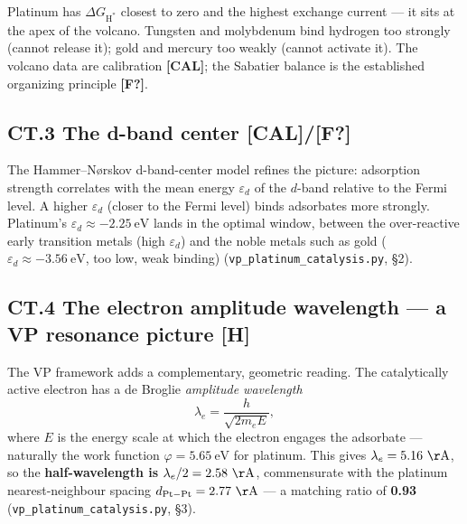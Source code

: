 \documentclass[
  10pt,
]{article}
\begin{document}
Platinum has \(\Delta G_{\mathrm H^*}\) closest to zero and the highest
exchange current --- it sits at the apex of the volcano. Tungsten and
molybdenum bind hydrogen too strongly (cannot release it); gold and
mercury too weakly (cannot activate it). The volcano data are
calibration \textbf{{[}CAL{]}}; the Sabatier balance is the established
organizing principle \textbf{{[}F?{]}}.

\hypertarget{ct.3-the-d-band-center-calf}{%
\subsection{\texorpdfstring{CT.3 The d-band center
\textbf{{[}CAL{]}/{[}F?{]}}}{CT.3 The d-band center {[}CAL{]}/{[}F?{]}}}\label{ct.3-the-d-band-center-calf}}

The Hammer--Nørskov d-band-center model refines the picture: adsorption
strength correlates with the mean energy \(\varepsilon_d\) of the
\(d\)-band relative to the Fermi level. A higher \(\varepsilon_d\)
(closer to the Fermi level) binds adsorbates more strongly. Platinum's
\(\varepsilon_d \approx -2.25\ \mathrm{eV}\) lands in the optimal
window, between the over-reactive early transition metals (high
\(\varepsilon_d\)) and the noble metals such as gold
(\(\varepsilon_d \approx -3.56\ \mathrm{eV}\), too low, weak binding)
(\texttt{vp\_platinum\_catalysis.py}, §2).

\hypertarget{ct.4-the-electron-amplitude-wavelength-a-vp-resonance-picture-h}{%
\subsection{\texorpdfstring{CT.4 The electron amplitude wavelength --- a
VP resonance picture
\textbf{{[}H{]}}}{CT.4 The electron amplitude wavelength --- a VP resonance picture {[}H{]}}}\label{ct.4-the-electron-amplitude-wavelength-a-vp-resonance-picture-h}}

The VP framework adds a complementary, geometric reading. The
catalytically active electron has a de Broglie \emph{amplitude
wavelength} \[ \lambda_e = \frac{h}{\sqrt{2 m_e E}}, \] where \(E\) is
the energy scale at which the electron engages the adsorbate ---
naturally the work function \(\varphi = 5.65\ \mathrm{eV}\) for
platinum. This gives \(\lambda_e = 5.16\ \mathrm{\AA}\), so the
\textbf{half-wavelength is \(\lambda_e/2 = 2.58\ \mathrm{\AA}\)},
commensurate with the platinum nearest-neighbour spacing
\(d_{\mathrm{Pt-Pt}} = 2.77\ \mathrm{\AA}\) --- a matching ratio of
\textbf{0.93} (\texttt{vp\_platinum\_catalysis.py}, §3).
\end{document}

